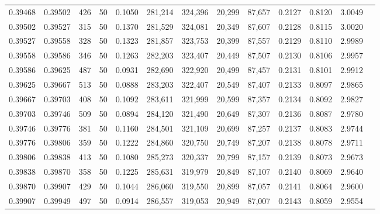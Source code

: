 \begin{tabular}{rrrrrrrrrrrrr}
0.39468 & 0.39502 &   426 &  50 &                                     0.1050 & 281,214 & 324,396 &  20,299 &  87,657 & 0.2127 & 0.8120 & 3.0049 \\
0.39502 & 0.39527 &   315 &  50 &                                     0.1370 & 281,529 & 324,081 &  20,349 &  87,607 & 0.2128 & 0.8115 & 3.0020 \\
0.39527 & 0.39558 &   328 &  50 &                                     0.1323 & 281,857 & 323,753 &  20,399 &  87,557 & 0.2129 & 0.8110 & 2.9989 \\
0.39558 & 0.39586 &   346 &  50 &                                     0.1263 & 282,203 & 323,407 &  20,449 &  87,507 & 0.2130 & 0.8106 & 2.9957 \\
0.39586 & 0.39625 &   487 &  50 &                                     0.0931 & 282,690 & 322,920 &  20,499 &  87,457 & 0.2131 & 0.8101 & 2.9912 \\
0.39625 & 0.39667 &   513 &  50 &                                     0.0888 & 283,203 & 322,407 &  20,549 &  87,407 & 0.2133 & 0.8097 & 2.9865 \\
0.39667 & 0.39703 &   408 &  50 &                                     0.1092 & 283,611 & 321,999 &  20,599 &  87,357 & 0.2134 & 0.8092 & 2.9827 \\
0.39703 & 0.39746 &   509 &  50 &                                     0.0894 & 284,120 & 321,490 &  20,649 &  87,307 & 0.2136 & 0.8087 & 2.9780 \\
0.39746 & 0.39776 &   381 &  50 &                                     0.1160 & 284,501 & 321,109 &  20,699 &  87,257 & 0.2137 & 0.8083 & 2.9744 \\
0.39776 & 0.39806 &   359 &  50 &                                     0.1222 & 284,860 & 320,750 &  20,749 &  87,207 & 0.2138 & 0.8078 & 2.9711 \\
0.39806 & 0.39838 &   413 &  50 &                                     0.1080 & 285,273 & 320,337 &  20,799 &  87,157 & 0.2139 & 0.8073 & 2.9673 \\
0.39838 & 0.39870 &   358 &  50 &                                     0.1225 & 285,631 & 319,979 &  20,849 &  87,107 & 0.2140 & 0.8069 & 2.9640 \\
0.39870 & 0.39907 &   429 &  50 &                                     0.1044 & 286,060 & 319,550 &  20,899 &  87,057 & 0.2141 & 0.8064 & 2.9600 \\
0.39907 & 0.39949 &   497 &  50 &                                     0.0914 & 286,557 & 319,053 &  20,949 &  87,007 & 0.2143 & 0.8059 & 2.9554 \\

\end{tabular}
